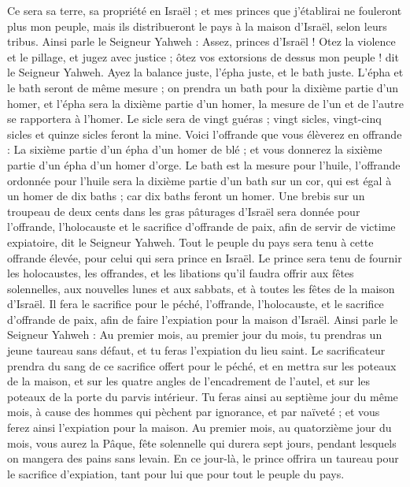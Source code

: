 \begin{multicols}{2}
Ce sera sa terre, sa propriété en Israël ; et mes princes que j'établirai ne fouleront plus mon peuple, mais ils distribueront le pays à la maison d'Israël, selon leurs tribus.
Ainsi parle le Seigneur Yahweh : Assez, princes d'Israël ! Otez la violence et le pillage, et jugez avec justice ; ôtez vos extorsions de dessus mon peuple ! dit le Seigneur Yahweh.
Ayez la balance juste, l'épha juste, et le bath juste.
L'épha et le bath seront de même mesure ; on prendra un bath pour la dixième partie d'un homer, et l'épha sera la dixième partie d'un homer, la mesure de l'un et de l'autre se rapportera à l'homer.
Le sicle sera de vingt guéras ; vingt sicles, vingt-cinq sicles et quinze sicles feront la mine.
Voici l’offrande que vous élèverez en offrande : La sixième partie d'un épha d'un homer de blé ; et vous donnerez la sixième partie d'un épha d'un homer d'orge.
Le bath est la mesure pour l'huile, l'offrande ordonnée pour l'huile sera la dixième partie d'un bath sur un cor, qui est égal à un homer de dix baths ; car dix baths feront un homer.
Une brebis sur un troupeau de deux cents dans les gras pâturages d’Israël sera donnée pour l’offrande, l’holocauste et le sacrifice d’offrande de paix, afin de servir de victime expiatoire, dit le Seigneur Yahweh.
Tout le peuple du pays sera tenu à cette offrande élevée, pour celui qui sera prince en Israël.
Le prince sera tenu de fournir les holocaustes, les offrandes, et les libations qu'il faudra offrir aux fêtes solennelles, aux nouvelles lunes et aux sabbats, et à toutes les fêtes de la maison d'Israël. Il fera le sacrifice pour le péché, l’offrande, l’holocauste, et le sacrifice d’offrande de paix, afin de faire l’expiation pour la maison d'Israël.
Ainsi parle le Seigneur Yahweh : Au premier mois, au premier jour du mois, tu prendras un jeune taureau sans défaut, et tu feras l’expiation du lieu saint.
Le sacrificateur prendra du sang de ce sacrifice offert pour le péché, et en mettra sur les poteaux de la maison, et sur les quatre angles de l’encadrement de l'autel, et sur les poteaux de la porte du parvis intérieur.
Tu feras ainsi au septième jour du même mois, à cause des hommes qui pèchent par ignorance, et par naïveté ; et vous ferez ainsi l’expiation pour la maison.
Au premier mois, au quatorzième jour du mois, vous aurez la Pâque, fête solennelle qui durera sept jours, pendant lesquels on mangera des pains sans levain.
En ce jour-là, le prince offrira un taureau pour le sacrifice d’expiation, tant pour lui que pour tout le peuple du pays.

\end{multicols}
